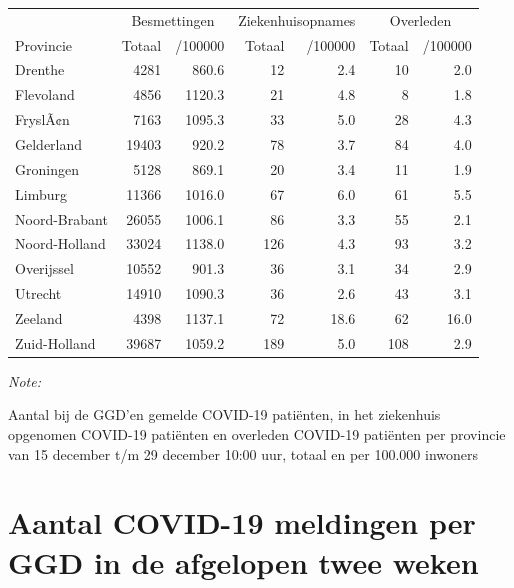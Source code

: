 \documentclass[
  english,
  man,floatsintext]{apa6}
\begin{document}
\begin{table}
\centering
\begin{threeparttable}
\begin{tabular}{lrrrrrr}
\toprule
\multicolumn{1}{c}{ } & \multicolumn{2}{c}{Besmettingen} & \multicolumn{2}{c}{Ziekenhuisopnames} & \multicolumn{2}{c}{Overleden} \\
\cmidrule(l{3pt}r{3pt}){2-3} \cmidrule(l{3pt}r{3pt}){4-5} \cmidrule(l{3pt}r{3pt}){6-7}
Provincie & Totaal & /100000 & Totaal & /100000 & Totaal & /100000\\
\midrule
Drenthe & 4281 & 860.6 & 12 & 2.4 & 10 & 2.0\\
Flevoland & 4856 & 1120.3 & 21 & 4.8 & 8 & 1.8\\
FryslÃ¢n & 7163 & 1095.3 & 33 & 5.0 & 28 & 4.3\\
Gelderland & 19403 & 920.2 & 78 & 3.7 & 84 & 4.0\\
Groningen & 5128 & 869.1 & 20 & 3.4 & 11 & 1.9\\
Limburg & 11366 & 1016.0 & 67 & 6.0 & 61 & 5.5\\
Noord-Brabant & 26055 & 1006.1 & 86 & 3.3 & 55 & 2.1\\
Noord-Holland & 33024 & 1138.0 & 126 & 4.3 & 93 & 3.2\\
Overijssel & 10552 & 901.3 & 36 & 3.1 & 34 & 2.9\\
Utrecht & 14910 & 1090.3 & 36 & 2.6 & 43 & 3.1\\
Zeeland & 4398 & 1137.1 & 72 & 18.6 & 62 & 16.0\\
Zuid-Holland & 39687 & 1059.2 & 189 & 5.0 & 108 & 2.9\\
\bottomrule
\end{tabular}
\begin{tablenotes}
\item \textit{Note: } 
\item Aantal bij de GGD’en gemelde COVID-19 patiënten, in het ziekenhuis opgenomen COVID-19 patiënten en overleden COVID-19 patiënten per provincie van 15 december t/m 29 december 10:00 uur, totaal en per 100.000 inwoners
\end{tablenotes}
\end{threeparttable}
\end{table}

\newpage

\hypertarget{aantal-covid-19-meldingen-per-ggd-in-de-afgelopen-twee-weken}{%
\section{Aantal COVID-19 meldingen per GGD in de afgelopen twee weken}\label{aantal-covid-19-meldingen-per-ggd-in-de-afgelopen-twee-weken}}
\end{document}

